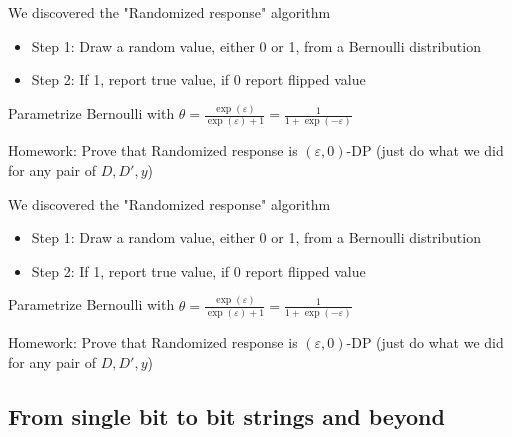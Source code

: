 \documentclass[12pt,aspectratio=169,handout]{beamer}
\begin{document}
\begin{frame}{We discovered the "Randomized response" algorithm}

\begin{itemize}
\item Step 1: Draw a random value, either 0 or 1, from a Bernoulli distribution
\item Step 2: If 1, report true value, if 0 report flipped value
\end{itemize}

Parametrize Bernoulli with $\theta = \frac{\exp(\varepsilon)}{\exp(\varepsilon) + 1} = \frac{1}{1 + \exp(- \varepsilon)}$

Homework: Prove that Randomized response is $(\varepsilon, 0)$-DP (just do what we did for any pair of $D, D', y$)


\end{frame}





\begin{frame}{We discovered the "Randomized response" algorithm}

\begin{itemize}
\item Step 1: Draw a random value, either 0 or 1, from a Bernoulli distribution
\item Step 2: If 1, report true value, if 0 report flipped value
\end{itemize}

Parametrize Bernoulli with $\theta = \frac{\exp(\varepsilon)}{\exp(\varepsilon) + 1} = \frac{1}{1 + \exp(- \varepsilon)}$

Homework: Prove that Randomized response is $(\varepsilon, 0)$-DP (just do what we did for any pair of $D, D', y$)


\end{frame}






\subsection{From single bit to bit strings and beyond}
\label{sec:randomized.response.bitstring}
\end{document}
